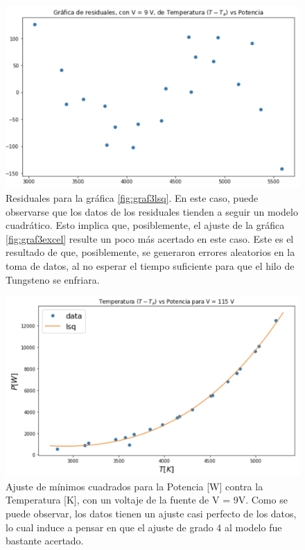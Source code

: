 \documentclass[%
 reprint,
 amsmath,amssymb,
 aps,
]{revtex4-1}
\begin{document}
\begin{figure}[H]
    \centering
    \includegraphics[scale= 0.3]{graf3res.png}
    \caption{Residuales para la gráfica \ref{fig:graf3lsq}. En este caso, puede observarse que los datos de los residuales tienden a seguir un modelo cuadrático. Esto implica que, posiblemente, el ajuste de la gráfica \ref{fig:graf3excel} resulte un poco más acertado en este caso. Este es el resultado de que, posiblemente, se generaron errores aleatorios en la toma de datos, al no esperar el tiempo suficiente para que el hilo de Tungsteno se enfriara.} 
    \label{fig:Figura 2}
\end{figure}

\begin{figure}[H]
    \centering
    \includegraphics[scale= 0.3]{graf4lsq.png}
    \caption{Ajuste de mínimos cuadrados para la Potencia [W] contra la Temperatura [K], con un voltaje de la fuente de V = 9V. Como se puede observar, los datos tienen un ajuste casi perfecto de los datos, lo cual induce a pensar en que el ajuste de grado 4 al modelo fue bastante acertado.}
    \label{fig:graf4lsq}
\end{figure}
\end{document}
